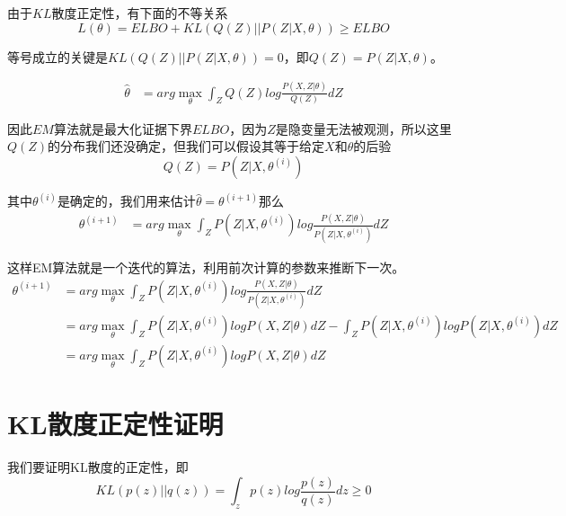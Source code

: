 由于$KL$散度正定性，有下面的不等关系
\begin{equation}
    L(\theta)=ELBO+KL(Q(Z)||P(Z|X,\theta))\geqslant ELBO
\end{equation}

等号成立的关键是$KL(Q(Z)||P(Z|X,\theta))=0$，即$Q(Z)=P(Z|X,\theta)$。

\begin{equation}
    \begin{aligned}
        \hat{\theta} &= arg\max_{\theta}\int_{Z}Q(Z)log\frac{P(X,Z|\theta)}{Q(Z)}dZ
    \end{aligned}
\end{equation}

因此$EM$算法就是最大化证据下界$ELBO$，因为$Z$是隐变量无法被观测，所以这里$Q(Z)$的分布我们还没确定，但我们可以假设其等于给定$X$和$\theta$的后验
\begin{equation}
    Q(Z)=P(Z|X,\theta^{(i)})
\end{equation}

其中$\theta^{(i)}$是确定的，我们用来估计$\hat{\theta}=\theta^{(i+1)}$那么
\begin{equation}
    \begin{aligned}
        \theta^{(i+1)} &= arg\max_{\theta}\int_{Z}P(Z|X,\theta^{(i)})log\frac{P(X,Z|\theta)}{P(Z|X,\theta^{(i)})}dZ
    \end{aligned}
\end{equation}

这样EM算法就是一个迭代的算法，利用前次计算的参数来推断下一次。
\begin{equation}
    \begin{aligned}
        \theta^{(i+1)} &= arg\max_{\theta}\int_{Z}P(Z|X,\theta^{(i)})log\frac{P(X,Z|\theta)}{P(Z|X,\theta^{(i)})}dZ\\
        &=arg\max_{\theta}\int_{Z}P(Z|X,\theta^{(i)})logP(X,Z|\theta)dZ-\int_{Z}P(Z|X,\theta^{(i)})logP(Z|X,\theta^{(i)})dZ\\
        &= arg\max_{\theta}\int_{Z}P(Z|X,\theta^{(i)})logP(X,Z|\theta)dZ
    \end{aligned}
\end{equation}

\section{KL散度正定性证明}

我们要证明KL散度的正定性，即
\begin{equation}
    KL(p(z)||q(z))=\int_{z}p(z)log\frac{p(z)}{q(z)}dz\geqslant 0
\end{equation}

